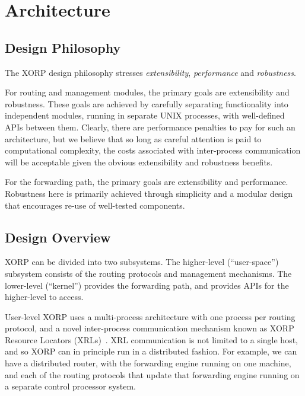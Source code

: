\documentclass[11pt]{article}
\begin{document}
\section{Architecture}

\subsection{Design Philosophy}

The XORP design philosophy stresses {\em extensibility},
{\em performance} and {\em robustness}.

For routing and management modules, the primary goals are
extensibility and robustness.  These goals are achieved by carefully
separating functionality into independent modules, running in separate
UNIX processes, with well-defined APIs between them.  Clearly, there
are performance penalties to pay for such an architecture, but we
believe that so long as careful attention is paid to computational
complexity, the costs associated with inter-process communication will
be acceptable given the obvious extensibility and robustness benefits.

For the forwarding path, the primary goals are extensibility and
performance.  Robustness here is primarily achieved through
simplicity and a modular design that encourages re-use of well-tested
components.


\subsection{Design Overview}

XORP can be divided into two subsystems. The higher-level
(``user-space'') subsystem consists of the routing protocols and
management mechanisms. The lower-level (``kernel'') provides the
forwarding path, and provides APIs for the higher-level to access.

User-level XORP uses a multi-process architecture with one process per
routing protocol, and a novel inter-process communication mechanism
known as XORP Resource Locators (XRLs)~\cite{xorp:xrl}. XRL
communication is not limited to a single host, and so XORP can in
principle run in a distributed fashion. For example, we can have a
distributed router, with the forwarding engine running on one machine,
and each of the routing protocols that update that forwarding engine
running on a separate control processor system.
\end{document}
